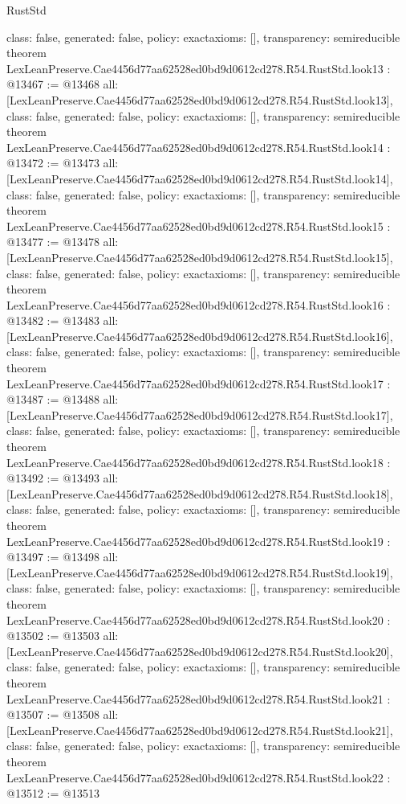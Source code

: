 \begin{lexlean}{RustStd}
\begin{coremodule}
{  class: false,
  generated: false,
  policy: exact{axioms: []},
  transparency: semireducible
}
theorem LexLeanPreserve.Cae4456d77aa62528ed0bd9d0612cd278.R54.RustStd.look13 : @13467 := @13468 {
  all: [LexLeanPreserve.Cae4456d77aa62528ed0bd9d0612cd278.R54.RustStd.look13],
  class: false,
  generated: false,
  policy: exact{axioms: []},
  transparency: semireducible
}
theorem LexLeanPreserve.Cae4456d77aa62528ed0bd9d0612cd278.R54.RustStd.look14 : @13472 := @13473 {
  all: [LexLeanPreserve.Cae4456d77aa62528ed0bd9d0612cd278.R54.RustStd.look14],
  class: false,
  generated: false,
  policy: exact{axioms: []},
  transparency: semireducible
}
theorem LexLeanPreserve.Cae4456d77aa62528ed0bd9d0612cd278.R54.RustStd.look15 : @13477 := @13478 {
  all: [LexLeanPreserve.Cae4456d77aa62528ed0bd9d0612cd278.R54.RustStd.look15],
  class: false,
  generated: false,
  policy: exact{axioms: []},
  transparency: semireducible
}
theorem LexLeanPreserve.Cae4456d77aa62528ed0bd9d0612cd278.R54.RustStd.look16 : @13482 := @13483 {
  all: [LexLeanPreserve.Cae4456d77aa62528ed0bd9d0612cd278.R54.RustStd.look16],
  class: false,
  generated: false,
  policy: exact{axioms: []},
  transparency: semireducible
}
theorem LexLeanPreserve.Cae4456d77aa62528ed0bd9d0612cd278.R54.RustStd.look17 : @13487 := @13488 {
  all: [LexLeanPreserve.Cae4456d77aa62528ed0bd9d0612cd278.R54.RustStd.look17],
  class: false,
  generated: false,
  policy: exact{axioms: []},
  transparency: semireducible
}
theorem LexLeanPreserve.Cae4456d77aa62528ed0bd9d0612cd278.R54.RustStd.look18 : @13492 := @13493 {
  all: [LexLeanPreserve.Cae4456d77aa62528ed0bd9d0612cd278.R54.RustStd.look18],
  class: false,
  generated: false,
  policy: exact{axioms: []},
  transparency: semireducible
}
theorem LexLeanPreserve.Cae4456d77aa62528ed0bd9d0612cd278.R54.RustStd.look19 : @13497 := @13498 {
  all: [LexLeanPreserve.Cae4456d77aa62528ed0bd9d0612cd278.R54.RustStd.look19],
  class: false,
  generated: false,
  policy: exact{axioms: []},
  transparency: semireducible
}
theorem LexLeanPreserve.Cae4456d77aa62528ed0bd9d0612cd278.R54.RustStd.look20 : @13502 := @13503 {
  all: [LexLeanPreserve.Cae4456d77aa62528ed0bd9d0612cd278.R54.RustStd.look20],
  class: false,
  generated: false,
  policy: exact{axioms: []},
  transparency: semireducible
}
theorem LexLeanPreserve.Cae4456d77aa62528ed0bd9d0612cd278.R54.RustStd.look21 : @13507 := @13508 {
  all: [LexLeanPreserve.Cae4456d77aa62528ed0bd9d0612cd278.R54.RustStd.look21],
  class: false,
  generated: false,
  policy: exact{axioms: []},
  transparency: semireducible
}
theorem LexLeanPreserve.Cae4456d77aa62528ed0bd9d0612cd278.R54.RustStd.look22 : @13512 := @13513 {
}
\end{coremodule}
\end{lexlean}
